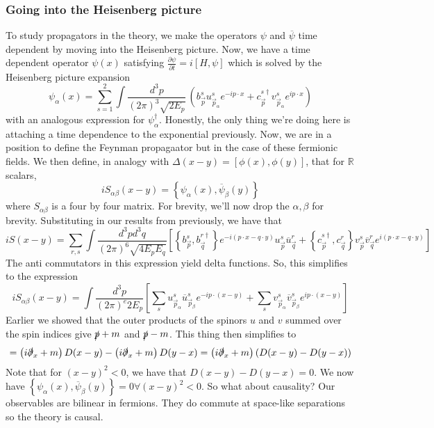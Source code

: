 \subsubsection{Going into the Heisenberg picture}
To study propagators in the theory, 
we make the operators $ \psi $ and $ \overline{ \psi } $ time 
dependent by moving into the Heisenberg picture. 
Now, we have a time dependent operator $ \psi ( x) $ satisfying 
$ \frac{\partial  \psi }{\partial  t }  = i \left[  H , \psi  \right]   $ 
which is solved by the Heisenberg picture expansion 
\[
\psi _ \alpha ( x ) = \sum_{ s = 1 } ^ 2 \int \frac{ d ^ 3 p }{ ( 2 \pi ) ^ 3 \sqrt{ 2 E _ p }  } \, 
\left(  b^ s _{\vec{p} } u_{ \vec{p}_ \alpha } ^s e^{ - i p \cdot  x } 
+ c _{\vec{p} } ^{ s \dagger } v_{\vec{p} _ \alpha } ^ s e ^{ i p \cdot  x } \right)  
\] with an analogous expression for $ \psi_ \alpha ^ \dagger $. Honestly, 
the only thing we're doing here is 
attaching a time dependence to the exponential 
previously. Now, we are in a 
position to define the Feynman propagaator 
but in the case of these fermionic fields. 
We then define, in analogy with $ \Delta ( x -y )  = \left[  \phi ( x) , \phi ( y )  \right]  $, 
that for $ \mathbb{ R }$ scalars, 
\[
i S_{ \alpha \beta } ( x  - y )  = \left\{  \psi _ \alpha ( x ) , \overline{ \psi } _ \beta ( y )  \right\} 
\] where $ S _{ \alpha \beta } $ is a four by four matrix. 
For brevity, we'll now drop the $ \alpha , \beta $ for brevity. 
Substituting in our results from previously, 
we have that 
\[
i S ( x - y ) = \sum_{ r, s } \int \frac{ d ^ 3 p d ^ 3 q  }{ ( 2 \pi ) ^ 6 \sqrt{ 4 E_ p E _ q }  } 
\left[  \left\{  b_{ \vec{p} } ^ s , b_{ \vec{q} } ^{ r \dagger }  \right\} e ^{  - i ( p \cdot  x  - q \cdot  y ) }
u_{ \vec{p} } ^ s \overline{u } _{ \vec{q} } ^ r + 
\left\{  c_{\vec{p} } ^{ s \dagger } , c _{\vec{q} } ^{ r } \right\}  v _{ \vec{p} } ^ s 
\overline{ v } _{\vec{q} } ^{ r } e ^{ i ( p \cdot  x - q \cdot  y ) } \right] 
\]
The anti commutators in this expression yield 
delta functions. So, this simplifies to the expression 
\[
i S_{ \alpha \beta } ( x -y )  = \int \frac{d ^ 3 p }{ ( 2 \pi ) ^ e 2 E_ p } 
\left[  \sum _s u_{ \vec{p} _ \alpha } ^ s \overline{ u } _{ \vec{p} _ \beta } ^ s 
e ^{ - i p \cdot  ( x - y ) } + \sum _ s v_{ \vec{p} _ \alpha } ^ s 
\overline{ v } _{ \vec{p} _ \beta } ^ s e ^{ i p \cdot  ( x  -y ) }\right] 
\] Earlier we showed that the outer products 
of the spinors $ u $ and $ v $ summed 
over the spin indices give $\slashed{p} + m $ and $ \slashed{p} - m $. 
This thing then simplifies to 
\[
= \left(  i \slashed{\partial } _ x + m   \right)  D ( x - y )  - \left(  i 
\slashed{\partial} _ x + m \right)  D ( y - x )  = \left(  i \slashed{\partial} _ x 
+ m \right)  \left(  D ( x - y ) - D ( y  - x)  \right) 
\] 
Note that for $ ( x - y ) ^ 2 < 0 $, we have that $ D ( x - y ) - D ( y - x) =0  $. 
We now have $ \left\{  \psi _ \alpha ( x) , \overline{ \psi  }_ \beta ( y )  \right\}   = 0\forall ( x - y ) ^ 2 < 0 $. 
So what about causality? Our observables are bilinear in fermions. 
They do commute at space-like separations so the theory is causal. 


